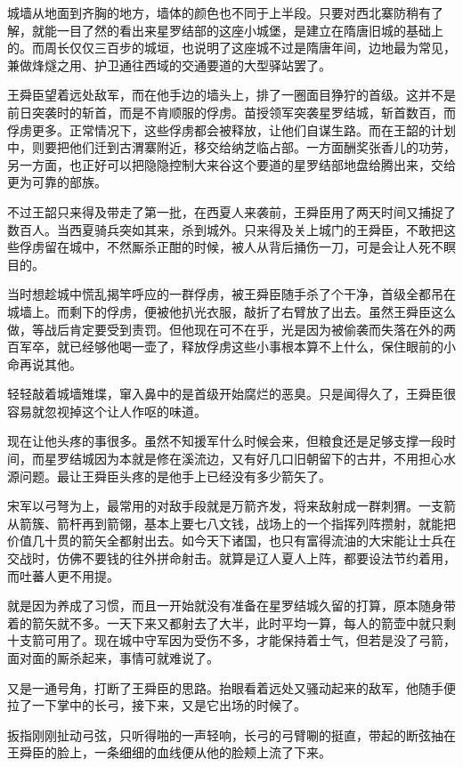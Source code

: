 城墙从地面到齐胸的地方，墙体的颜色也不同于上半段。只要对西北寨防稍有了解，就能一目了然的看出来星罗结部的这座小城堡，是建立在隋唐旧城的基础上的。而周长仅仅三百步的城垣，也说明了这座城不过是隋唐年间，边地最为常见，兼做烽燧之用、护卫通往西域的交通要道的大型驿站罢了。

王舜臣望着远处敌军，而在他手边的墙头上，排了一圈面目狰狞的首级。这并不是前日突袭时的斩首，而是不肯顺服的俘虏。苗授领军突袭星罗结城，斩首数百，而俘虏更多。正常情况下，这些俘虏都会被释放，让他们自谋生路。而在王韶的计划中，则要把他们迁到古渭寨附近，移交给纳芝临占部。一方面酬奖张香儿的功劳，另一方面，也正好可以把隐隐控制大来谷这个要道的星罗结部地盘给腾出来，交给更为可靠的部族。

不过王韶只来得及带走了第一批，在西夏人来袭前，王舜臣用了两天时间又捕捉了数百人。当西夏骑兵突如其来，杀到城外。只来得及关上城门的王舜臣，不敢把这些俘虏留在城中，不然厮杀正酣的时候，被人从背后捅伤一刀，可是会让人死不瞑目的。

当时想趁城中慌乱揭竿呼应的一群俘虏，被王舜臣随手杀了个干净，首级全都吊在城墙上。而剩下的俘虏，便被他扒光衣服，敲折了右臂放了出去。虽然王舜臣这么做，等战后肯定要受到责罚。但他现在可不在乎，光是因为被偷袭而失落在外的两百军卒，就已经够他喝一壶了，释放俘虏这些小事根本算不上什么，保住眼前的小命再说其他。

轻轻敲着城墙雉堞，窜入鼻中的是首级开始腐烂的恶臭。只是闻得久了，王舜臣很容易就忽视掉这个让人作呕的味道。

现在让他头疼的事很多。虽然不知援军什么时候会来，但粮食还是足够支撑一段时间，而星罗结城因为本就是修在溪流边，又有好几口旧朝留下的古井，不用担心水源问题。最让王舜臣头疼的是他手上已经没有多少箭矢了。

宋军以弓弩为上，最常用的对敌手段就是万箭齐发，将来敌射成一群刺猬。一支箭从箭簇、箭杆再到箭翎，基本上要七八文钱，战场上的一个指挥列阵攒射，就能把价值几十贯的箭矢全都射出去。如今天下诸国，也只有富得流油的大宋能让士兵在交战时，仿佛不要钱的往外拼命射击。就算是辽人夏人上阵，都要设法节约着用，而吐蕃人更不用提。

就是因为养成了习惯，而且一开始就没有准备在星罗结城久留的打算，原本随身带着的箭矢就不多。一天下来又都射去了大半，此时平均一算，每人的箭壶中就只剩十支箭可用了。现在城中守军因为受伤不多，才能保持着士气，但若是没了弓箭，面对面的厮杀起来，事情可就难说了。

又是一通号角，打断了王舜臣的思路。抬眼看着远处又骚动起来的敌军，他随手便拉了一下掌中的长弓，接下来，又是它出场的时候了。

扳指刚刚扯动弓弦，只听得啪的一声轻响，长弓的弓臂唰的挺直，带起的断弦抽在王舜臣的脸上，一条细细的血线便从他的脸颊上流了下来。


